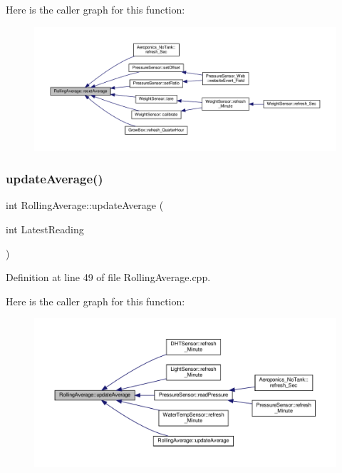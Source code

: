 Here is the caller graph for this function\+:
\nopagebreak
\begin{figure}[H]
\begin{center}
\leavevmode
\includegraphics[width=350pt]{class_rolling_average_a5413499ba156dd5acec73196edfda3d4_icgraph}
\end{center}
\end{figure}
\mbox{\label{class_rolling_average_aa1fd09fa8d80046179ed7ed91bfed6d0}} 
\subsubsection{\texorpdfstring{update\+Average()}{updateAverage()}\hspace{0.1cm}{\footnotesize\ttfamily [1/4]}}
{\footnotesize\ttfamily int Rolling\+Average\+::update\+Average (\begin{DoxyParamCaption}\item[{int}]{Latest\+Reading }\end{DoxyParamCaption})}



Definition at line 49 of file Rolling\+Average.\+cpp.

Here is the caller graph for this function\+:
\nopagebreak
\begin{figure}[H]
\begin{center}
\leavevmode
\includegraphics[width=350pt]{class_rolling_average_aa1fd09fa8d80046179ed7ed91bfed6d0_icgraph}
\end{center}
\end{figure}
\mbox{\label{class_rolling_average_aa1fd09fa8d80046179ed7ed91bfed6d0}} 
